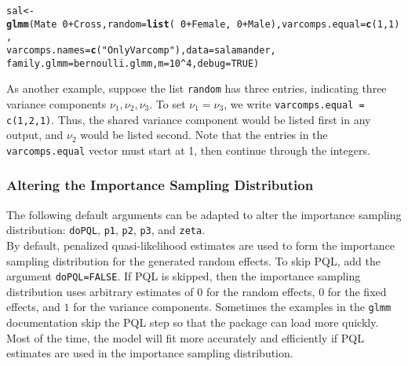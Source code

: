 \documentclass[11pt]{article}\usepackage[]{graphicx}\usepackage[]{color}
\makeatletter
\newcommand{\hlnum}[1]{\textcolor[rgb]{0.686,0.059,0.569}{#1}}%
\newcommand{\hlstr}[1]{\textcolor[rgb]{0.192,0.494,0.8}{#1}}%
\newcommand{\hlopt}[1]{\textcolor[rgb]{0,0,0}{#1}}%
\newcommand{\hlstd}[1]{\textcolor[rgb]{0.345,0.345,0.345}{#1}}%
\newcommand{\hlkwb}[1]{\textcolor[rgb]{0.69,0.353,0.396}{#1}}%
\newcommand{\hlkwc}[1]{\textcolor[rgb]{0.333,0.667,0.333}{#1}}%
\newcommand{\hlkwd}[1]{\textcolor[rgb]{0.737,0.353,0.396}{\textbf{#1}}}%
\newenvironment{kframe}{%
 \def\at@end@of@kframe{}%
 \ifinner\ifhmode%
  \def\at@end@of@kframe{\end{minipage}}%
  \begin{minipage}{\columnwidth}%
 \fi\fi%
 \def\FrameCommand##1{\hskip\@totalleftmargin \hskip-\fboxsep
 \colorbox{shadecolor}{##1}\hskip-\fboxsep
     \hskip-\linewidth \hskip-\@totalleftmargin \hskip\columnwidth}%
 \MakeFramed {\advance\hsize-\width
   \@totalleftmargin\z@ \linewidth\hsize
   \@setminipage}}%
 {\par\unskip\endMakeFramed%
 \at@end@of@kframe}
\newenvironment{knitrout}{}{} %
\makeatother
\begin{document}
\begin{knitrout}
\color{fgcolor}\begin{kframe}
\begin{alltt}
\hlstd{sal}\hlkwb{<-}\hlkwd{glmm}\hlstd{(Mate}\hlopt{~}\hlnum{0}\hlopt{+}\hlstd{Cross,} \hlkwc{random}\hlstd{=}\hlkwd{list}\hlstd{(}\hlopt{~}\hlnum{0}\hlopt{+}\hlstd{Female,}\hlopt{~}\hlnum{0}\hlopt{+}\hlstd{Male),} \hlkwc{varcomps.equal}\hlstd{=}\hlkwd{c}\hlstd{(}\hlnum{1}\hlstd{,}\hlnum{1}\hlstd{),}
\hlkwc{varcomps.names}\hlstd{=}\hlkwd{c}\hlstd{(}\hlstr{"Only Varcomp"}\hlstd{),} \hlkwc{data}\hlstd{=salamander,}
\hlkwc{family.glmm}\hlstd{=bernoulli.glmm,} \hlkwc{m}\hlstd{=}\hlnum{10}\hlopt{^}\hlnum{4}\hlstd{,} \hlkwc{debug}\hlstd{=}\hlnum{TRUE}\hlstd{)}
\end{alltt}
\end{kframe}
\end{knitrout}
As another example, suppose the list \texttt{random} has three entries, indicating three variance components $\nu_1, \nu_2, \nu_3$. To set $\nu_1= \nu_3$, we write \texttt{varcomps.equal = c(1,2,1)}. Thus, the shared variance component would be listed first in any output, and $\nu_2$ would be listed second. Note that the entries in the \texttt{varcomps.equal} vector must start at 1, then continue through the integers.\\




\subsubsection{Altering the Importance Sampling Distribution}
The following default arguments can be adapted to alter the importance sampling distribution: \texttt{doPQL}, \texttt{p1}, \texttt{p2}, \texttt{p3}, and \texttt{zeta}.\\

By default, penalized quasi-likelihood estimates are used to form the importance sampling distribution for the generated random effects.  To skip PQL, add the argument \texttt{doPQL=FALSE}. If PQL is skipped, then the importance sampling distribution uses arbitrary estimates of $0$ for the random effects, $0$ for the fixed effects, and $1$ for the variance components. Sometimes the examples in the \texttt{glmm} documentation  skip the PQL step so that the package can load more quickly. Most of the time, the model will fit more accurately and efficiently if PQL estimates are used in the importance sampling distribution.\\
\end{document}
